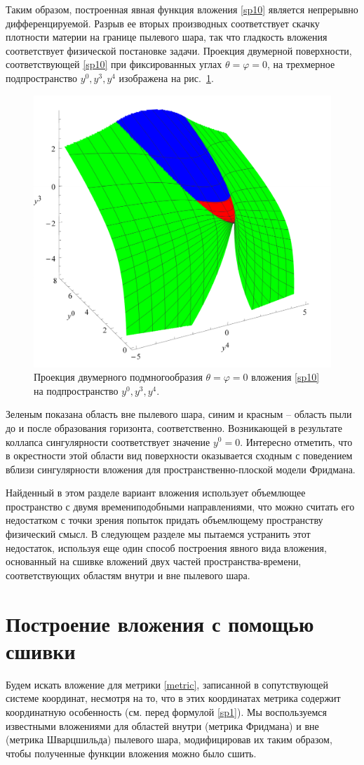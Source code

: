 \documentclass[12pt]{article}
\begin{document}
Таким образом, построенная явная функция вложения \eqref{sp10} является непрерывно дифференцируемой.
Разрыв ее вторых производных соответствует скачку плотности материи на границе пылевого шара, так что гладкость вложения
соответствует физической постановке задачи. Проекция двумерной поверхности, соответствующей \eqref{sp10}
при фиксированных углах $\theta=\varphi=0$, на трехмерное подпространство $y^0,y^3,y^4$ изображена
на рис.~\ref{pic_emb1}.
\begin{figure}[h!]
\centering
\includegraphics[width=0.55\linewidth]{col_emb-c2.pdf}
\caption{\label{pic_emb1}
Проекция двумерного подмногообразия $\theta=\varphi=0$ вложения \eqref{sp10} на подпространство $y^0,y^3,y^4$.
}
\end{figure}
Зеленым показана область вне пылевого шара, синим и красным -- область пыли до и после образования горизонта, соответственно.
Возникающей в результате коллапса сингулярности соответствует значение $y^0=0$. Интересно отметить, что
в окрестности этой области вид поверхности оказывается сходным с поведением вблизи сингулярности
вложения \cite{robertson1933} для пространственно-плоской модели Фридмана.

Найденный в этом разделе вариант вложения использует объемлющее пространство с двумя времениподобными направлениями,
что можно считать его недостатком с точки зрения попыток придать объемлющему пространству физический смысл.
В следующем разделе мы пытаемся устранить этот недостаток, используя еще один способ построения явного вида вложения,
основанный на сшивке вложений двух частей пространства-времени, соответствующих областям внутри и вне пылевого шара.


\section{Построение вложения с помощью сшивки}
Будем искать вложение для метрики \eqref{metric}, записанной в сопутствующей системе координат, несмотря на то, что
в этих координатах метрика содержит координатную особенность (см. перед формулой \eqref{sp1}).
Мы воспользуемся известными вложениями для областей внутри (метрика Фридмана) и вне  (метрика Шварцшильда)
пылевого шара, модифицировав их таким образом, чтобы полученные функции вложения можно было сшить.
\end{document}
